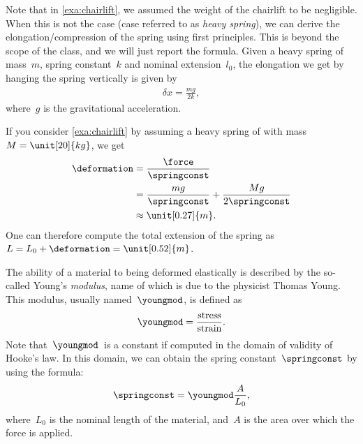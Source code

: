     Note that in \cref{exa:chairlift}, we assumed the weight of the chairlift to be negligible.
    When this is not the case (case referred to as \emph{heavy spring}), we can derive the elongation/compression of the spring using first principles.
    This is beyond the scope of the class, and we will just report the formula.
    Given a heavy spring of mass~$m$, spring constant~$k$ and nominal extension~$l_0$, the elongation we get by hanging the spring vertically is given by
    \begin{equation}
        \begin{aligned}
            \delta x =\frac{m g}{2k},
        \end{aligned}
    \end{equation}
    where~$g$ is the gravitational acceleration.

    \begin{example}
        If you consider \cref{exa:chairlift} by assuming a heavy spring of with mass~$M=\unit[20]{kg}$, we get
        \begin{equation}
            \begin{aligned}
                \deformation & =\frac{\force}{\springconst} \\
                             & =\frac{mg}{\springconst}+\frac{Mg}{2\springconst} \\
                             & \approx \unit[0.27]{m}.
            \end{aligned}
        \end{equation}
        One can therefore compute the total extension of the spring as~$L=L_0+\deformation=\unit[0.52]{m}$.
    \end{example}

    The ability of a material to being deformed elastically is described by the so-called Young's \emph{modulus}, name of which is due to the physicist Thomas Young.
    This modulus, usually named~$\youngmod$, is defined as
    \begin{equation}
        \youngmod=\frac{\text{stress}}{\text{strain}}.
    \end{equation}
    Note that~$\youngmod$~is a constant if computed in the domain of validity of Hooke's law.
    In this domain, we can obtain the spring constant~$\springconst$ by using the formula:
    \begin{equation}
        \springconst=\youngmod \frac{A}{L_0},
    \end{equation}
    where~$L_0$ is the nominal length of the material, and~$A$ is the area over which the force is applied.

